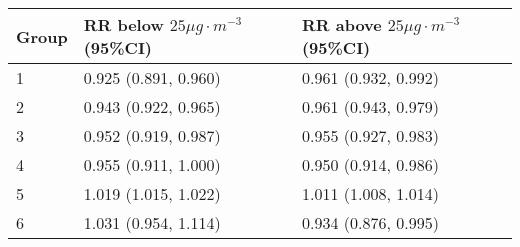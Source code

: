\begin{tabular}{lll}
  \hline
Group & RR below $25 \mu g \cdot m^{-3}$ (95\%CI) & RR above $25 \mu g \cdot m^{-3}$ (95\%CI) \\ 
  \hline
   1 & 0.925 (0.891, 0.960) & 0.961 (0.932, 0.992) \\ 
     2 & 0.943 (0.922, 0.965) & 0.961 (0.943, 0.979) \\ 
     3 & 0.952 (0.919, 0.987) & 0.955 (0.927, 0.983) \\ 
     4 & 0.955 (0.911, 1.000) & 0.950 (0.914, 0.986) \\ 
     5 & 1.019 (1.015, 1.022) & 1.011 (1.008, 1.014) \\ 
     6 & 1.031 (0.954, 1.114) & 0.934 (0.876, 0.995) \\ 
   \hline
\end{tabular}

